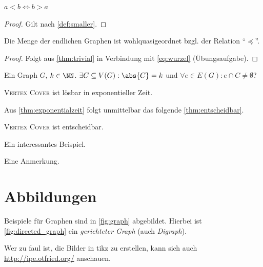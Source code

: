 \begin{lemma}[trivial]\label{thm:trivial}
	$a < b \iff b > a$
\end{lemma}
\begin{proof}
	Gilt nach \cref{def:smaller}.
\end{proof}

\begin{theorem}
	Die Menge der endlichen Graphen ist wohlquasigeordnet bzgl. der Relation \enquote{$\preceq$}.
\end{theorem}
\begin{proof}
	Folgt aus \cref{thm:trivial} in Verbindung mit \cref{eq:wurzel} (Übungsaufgabe).
\end{proof}

\newcommand{\vertexcover}{\textsc{Vertex Cover}}
\problemdef{\vertexcover{}}
{Ein Graph $G$, $k \in \NN$.}
{$\exists C \subseteq V(G) : \abs{C} = k$ und $\forall e \in E(G): e \cap C \neq \emptyset$?}

\begin{observation}\label{thm:exponentialzeit}
	\textsc{\vertexcover{}} ist lösbar in exponentieller Zeit.
\end{observation}

Aus \cref{thm:exponentialzeit} folgt unmittelbar das folgende \cref{thm:entscheidbar}.

\begin{corollary}\label{thm:entscheidbar}
	\textsc{\vertexcover{}} ist entscheidbar.
\end{corollary}

\begin{example}
	Ein interessantes Beispiel.
\end{example}

\begin{remark}
	Eine Anmerkung.
\end{remark}


\section{Abbildungen}

Beispiele für Graphen sind in \cref{fig:graph} abgebildet.
Hierbei ist \cref{fig:directed_graph} ein \textit{gerichteter Graph} (auch \textit{Digraph}).

Wer zu faul ist, die Bilder in tikz zu erstellen, kann sich auch \url{http://ipe.otfried.org/} anschauen.


